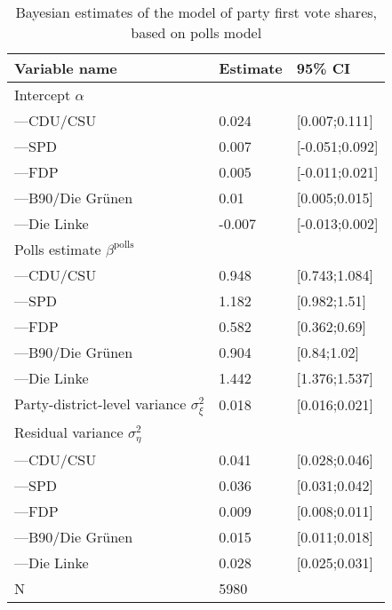 \begin{table}[t!]
\centering
\caption{Bayesian estimates of the model of party first vote shares, based on polls model} 
\begin{tabular}{lll}
  \hline
Variable name & Estimate & 95\% CI \\ 
  \hline
Intercept $\alpha$ &  &  \\ 
  ---CDU/CSU & 0.024 & [0.007;0.111] \\ 
  ---SPD & 0.007 & [-0.051;0.092] \\ 
  ---FDP & 0.005 & [-0.011;0.021] \\ 
  ---B90/Die Gr\"unen & 0.01 & [0.005;0.015] \\ 
  ---Die Linke & -0.007 & [-0.013;0.002] \\ 
  Polls estimate $\beta^\text{polls}$ &  &  \\ 
  ---CDU/CSU & 0.948 & [0.743;1.084] \\ 
  ---SPD & 1.182 & [0.982;1.51] \\ 
  ---FDP & 0.582 & [0.362;0.69] \\ 
  ---B90/Die Gr\"unen & 0.904 & [0.84;1.02] \\ 
  ---Die Linke & 1.442 & [1.376;1.537] \\ 
  Party-district-level variance $\sigma^2_{\xi}$  & 0.018 & [0.016;0.021] \\ 
  Residual variance $\sigma^2_{\eta}$ &  &  \\ 
  ---CDU/CSU & 0.041 & [0.028;0.046] \\ 
  ---SPD & 0.036 & [0.031;0.042] \\ 
  ---FDP & 0.009 & [0.008;0.011] \\ 
  ---B90/Die Gr\"unen & 0.015 & [0.011;0.018] \\ 
  ---Die Linke & 0.028 & [0.025;0.031] \\ 
  N & 5980 &  \\ 
   \hline
\end{tabular}
\end{table}
